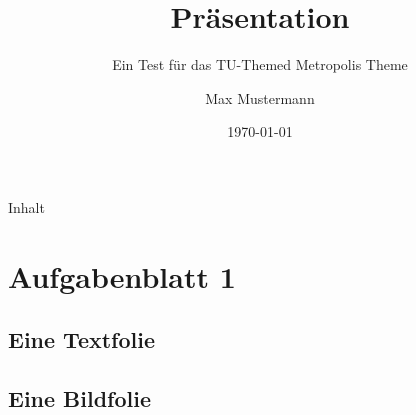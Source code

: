 \documentclass[aspectratio=1610]{../tuprolis}
\title{Präsentation}
\subtitle{Ein Test für das TU-Themed Metropolis Theme}
\institute{Dortmund Corp}
\author{Max Mustermann}
\date{\today}
\begin{document}
	
\frame[plain]{\titlepage} 

\begin{frame}[plain]{Inhalt}
	\tableofcontents
\end{frame}


\section{Aufgabenblatt 1}

\subsection{Eine Textfolie}


\subsection{Eine Bildfolie}

\end{document}
